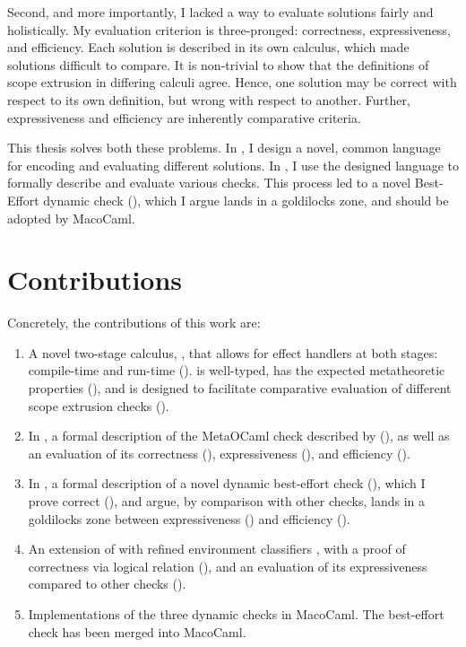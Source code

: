 Second, and more importantly, I lacked a way to evaluate solutions fairly and holistically. My evaluation criterion is three-pronged: correctness, expressiveness, and efficiency. Each solution is described in its own calculus, which made solutions difficult to compare. It is non-trivial to show that the definitions of scope extrusion in differing calculi agree. Hence, one solution may be correct with respect to its own definition, but wrong with respect to another. Further, expressiveness and efficiency are inherently comparative criteria.

This thesis solves both these problems. In , I design a novel, common language for encoding and evaluating different solutions. In , I use the designed language to formally describe and evaluate various checks. This process led to a novel Best-Effort dynamic check (), which I argue lands in a goldilocks zone, and should be adopted by MacoCaml.

\section{Contributions}

Concretely, the contributions of this work are:
\begin{enumerate}
    \item A novel two-stage calculus, \calculusName{}, that allows for effect handlers at both stages: compile-time and run-time (). \calculusName{} is well-typed, has the expected metatheoretic properties (), and is designed to facilitate comparative evaluation of different scope extrusion checks ().
    \item In \calculusName{}, a formal description of the MetaOCaml check described by \citet{kiselyov-14} (), as well as an evaluation of its correctness (), expressiveness (), and efficiency ().
    \item In \calculusName{}, a formal description of a novel dynamic best-effort check (), which I prove correct (), and argue, by comparison with other checks, lands in a goldilocks zone between expressiveness () and efficiency (). 
    \item An extension of \calculusName{} with refined environment classifiers \citep{kiselyov-16}, with a proof of correctness via logical relation (), and an evaluation of its expressiveness compared to other checks ().
    \item Implementations of the three dynamic checks in MacoCaml. The best-effort check has been merged into MacoCaml.
\end{enumerate}

